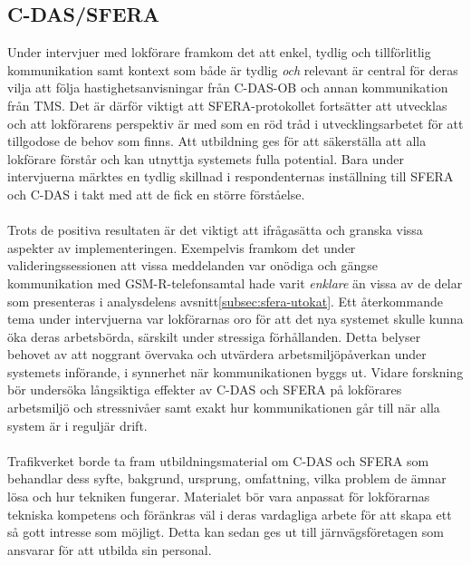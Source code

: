 \subsection{C-DAS/SFERA\@}
Under intervjuer med lokförare framkom det att enkel, tydlig och tillförlitlig kommunikation samt kontext som både är tydlig \emph{och} relevant är central för deras vilja att följa hastighetsanvisningar från C-DAS-OB och annan kommunikation från TMS\@.
Det är därför viktigt att SFERA-protokollet fortsätter att utvecklas och att lokförarens perspektiv är med som en röd tråd i utvecklingsarbetet för att tillgodose de behov som finns.
Att utbildning ges för att säkerställa att alla lokförare förstår och kan utnyttja systemets fulla potential.
Bara under intervjuerna märktes en tydlig skillnad i respondenternas inställning till SFERA och C-DAS i takt med att de fick en större förståelse.
\paragraph{}
\hspace{-12pt}
Trots de positiva resultaten är det viktigt att ifrågasätta och granska vissa aspekter av implementeringen.
Exempelvis framkom det under valideringssessionen att vissa meddelanden var onödiga och gängse kommunikation med GSM-R-telefonsamtal hade varit \emph{enklare} än vissa av de delar som presenteras i analysdelens avsnitt\ref{subsec:sfera-utokat}.
Ett återkommande tema under intervjuerna var lokförarnas oro för att det nya systemet skulle kunna öka deras arbetsbörda, särskilt under stressiga förhållanden.
Detta belyser behovet av att noggrant övervaka och utvärdera arbetsmiljöpåverkan under systemets införande, i synnerhet när kommunikationen byggs ut.
Vidare forskning bör undersöka långsiktiga effekter av C-DAS och SFERA på lokförares arbetsmiljö och stressnivåer samt exakt hur kommunikationen går till när alla system är i reguljär drift.
\paragraph{}
\hspace{-12pt}
Trafikverket borde ta fram utbildningsmaterial om C-DAS och SFERA som behandlar dess syfte, bakgrund, ursprung, omfattning, vilka problem de ämnar lösa och hur tekniken fungerar.
Materialet bör vara anpassat för lokförarnas tekniska kompetens och föränkras väl i deras vardagliga arbete för att skapa ett så gott intresse som möjligt.
Detta kan sedan ges ut till järnvägsföretagen som ansvarar för att utbilda sin personal.